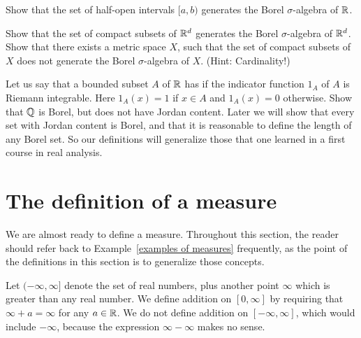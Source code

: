 \begin{exercise}
Show that the set of half-open intervals $[a, b)$ generates the Borel $\sigma$-algebra of $\mathbb{R}$.
\end{exercise}

\begin{exercise}
Show that the set of compact subsets of $\mathbb{R}^d$ generates the Borel $\sigma$-algebra of $\mathbb{R}^d$.
Show that there exists a metric space $X$, such that the set of compact subsets of $X$ does not generate the Borel $\sigma$-algebra of $X$. (Hint: Cardinality!)
\end{exercise}

\begin{exercise}
\label{Jordan content 1}
Let us say that a bounded subset $A$ of $\mathbb{R}$ has  if the indicator function $1_A$ of $A$ is Riemann integrable.
Here $1_A(x) = 1$ if $x \in A$ and $1_A(x) = 0$ otherwise.
Show that $\mathbb{Q}$ is Borel, but does not have Jordan content.
Later we will show that every set with Jordan content is Borel, and that it is reasonable to define the length of any Borel set.
So our definitions will generalize those that one learned in a first course in real analysis.
\end{exercise}


\section{The definition of a measure}
We are almost ready to define a measure.
Throughout this section, the reader should refer back to Example~\ref{examples of measures} frequently, as the point of the definitions in this section is to generalize those concepts.

\begin{subsec}
Let $(-\infty, \infty]$ denote the set of real numbers, plus another point $\infty$ which is greater than any real number.
We define addition on $[0, \infty]$ by requiring that $\infty + a = \infty$ for any $a \in \mathbb{R}$.
We do not define addition on $[-\infty, \infty]$, which would include $-\infty$, because the expression $\infty - \infty$ makes no sense.
\end{subsec}


